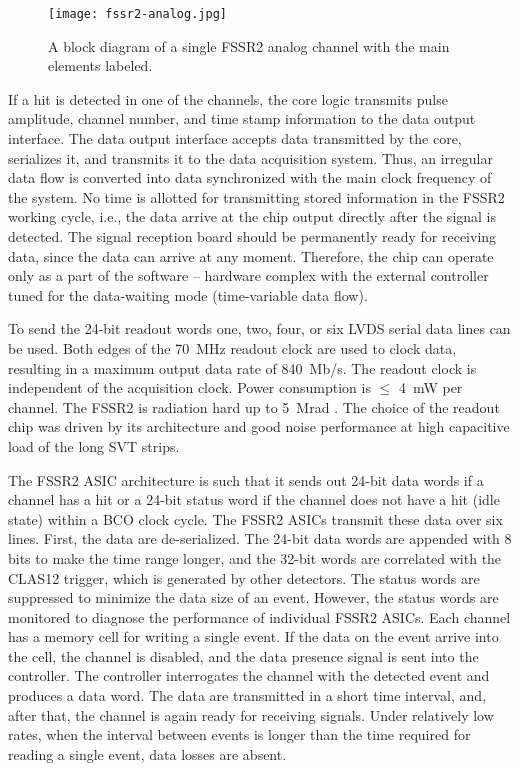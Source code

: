 \begin{figure}[hbt] 
\centering 
\texttt{[image: fssr2-analog.jpg]}
\caption{A block diagram of a single FSSR2 analog channel with the main elements labeled.}
\label{fig:fssr2-analog}
\end{figure}

If a hit is detected in one of the channels, the core logic transmits pulse amplitude, channel number, and time stamp
information to the data output interface. The data output interface accepts data transmitted by the core, serializes
it, and transmits it to the data acquisition system. Thus, an irregular data flow is converted into data synchronized
with the main clock frequency of the system. No time is allotted for transmitting stored information in the FSSR2
working cycle, i.e., the data arrive at the chip output directly after the signal is detected. The signal reception board
should be permanently ready for receiving data, since the data can arrive at any moment. Therefore, the chip can
operate only as a part of the software -- hardware complex with the external controller tuned for the data-waiting
mode (time-variable data flow). 

To send the 24-bit readout words one, two, four, or six LVDS serial data lines can be used. Both edges of the
70~MHz readout clock are used to clock data, resulting in a maximum output data rate of 840~Mb/s. The readout
clock is independent of the acquisition clock. Power consumption is $\le$ 4~mW per channel. The FSSR2 is radiation
hard up to 5~Mrad \cite{FSSRRAD}. The choice of the readout chip was driven by its architecture and good
noise performance at high capacitive load of the long SVT strips.

The FSSR2 ASIC architecture is such that it sends out 24-bit data words if a channel has a hit or a 24-bit status
word if the channel does not have a hit (idle state) within a BCO clock cycle. The FSSR2 ASICs transmit these data
over six lines. First, the data are de-serialized. The 24-bit data words are appended with 8 bits to make the time
range longer, and the 32-bit words are correlated with the CLAS12 trigger, which is generated by other detectors.
The status words are suppressed to minimize the data size of an event. However, the status words are monitored to
diagnose the performance of individual FSSR2 ASICs. Each channel has a memory cell for writing a single event. If
the data on the event arrive into the cell, the channel is disabled, and the data presence signal is sent into the
controller. The controller interrogates the channel with the detected event and produces a data word. The data are
transmitted in a short time interval, and, after that, the channel is again ready for receiving signals. Under relatively
low rates, when the interval between events is longer than the time required for reading a single event, data losses
are absent. 

